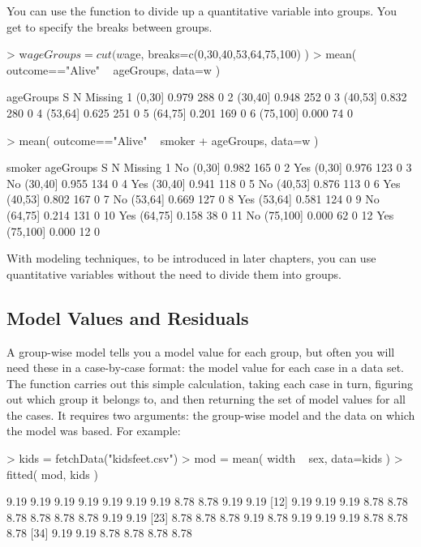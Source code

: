 You can use the  function to divide up a quantitative
variable into groups.  You get to specify the breaks between groups.
\begin{Schunk}
\begin{Sinput}
> w$ageGroups = cut(w$age, breaks=c(0,30,40,53,64,75,100) )
> mean( outcome=="Alive" ~ ageGroups, data=w )
\end{Sinput}
\begin{Soutput}
  ageGroups     S   N Missing
1    (0,30] 0.979 288       0
2   (30,40] 0.948 252       0
3   (40,53] 0.832 280       0
4   (53,64] 0.625 251       0
5   (64,75] 0.201 169       0
6  (75,100] 0.000  74       0
\end{Soutput}
\begin{Sinput}
> mean( outcome=="Alive" ~ smoker + ageGroups, data=w )
\end{Sinput}
\begin{Soutput}
   smoker ageGroups     S   N Missing
1      No    (0,30] 0.982 165       0
2     Yes    (0,30] 0.976 123       0
3      No   (30,40] 0.955 134       0
4     Yes   (30,40] 0.941 118       0
5      No   (40,53] 0.876 113       0
6     Yes   (40,53] 0.802 167       0
7      No   (53,64] 0.669 127       0
8     Yes   (53,64] 0.581 124       0
9      No   (64,75] 0.214 131       0
10    Yes   (64,75] 0.158  38       0
11     No  (75,100] 0.000  62       0
12    Yes  (75,100] 0.000  12       0
\end{Soutput}
\end{Schunk}

With modeling techniques, to be introduced in later chapters, you can use
quantitative variables without the need to divide them into groups.

\subsection{Model Values and Residuals}


A group-wise model tells you a model value for each group, but often
you will need these in a case-by-case format: the model value for each
case in a data set.  The  function carries out
this simple calculation, taking each case in turn, figuring out which
group it belongs to, and then returning the set of model values for
all the cases.  It requires two arguments: the group-wise model and
the data on which the model was based.  For example:


\begin{Schunk}
\begin{Sinput}
> kids = fetchData("kidsfeet.csv")
> mod = mean( width ~ sex, data=kids )
> fitted( mod, kids )
\end{Sinput}
\begin{Soutput}
 [1] 9.19 9.19 9.19 9.19 9.19 9.19 9.19 8.78 8.78 9.19 9.19
[12] 9.19 9.19 9.19 8.78 8.78 8.78 8.78 8.78 8.78 9.19 9.19
[23] 8.78 8.78 8.78 9.19 8.78 9.19 9.19 9.19 8.78 8.78 8.78
[34] 9.19 9.19 8.78 8.78 8.78 8.78
\end{Soutput}
\end{Schunk}

